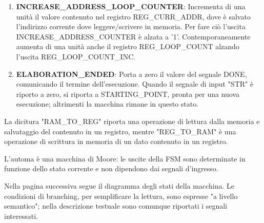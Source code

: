 \documentclass[a4paper]{article}
\begin{document}
\begin{enumerate}
    \item {\bf INCREASE\_ADDRESS\_LOOP\_COUNTER}: Incrementa di una unità il valore contenuto nel registro REG\_CURR\_ADDR, dove è salvato l'indirizzo corrente dove leggere/scrivere in memoria. Per fare ciò l'uscita INCREASE\_ADDRESS\_COUNTER è alzata a '1'. Contemporaneamente aumenta di una unità anche il registro REG\_LOOP\_COUNT alzando l'uscita REG\_LOOP\_COUNT\_INC.
    \item {\bf ELABORATION\_ENDED}: Porta a zero il valore del segnale DONE, comunicando il termine dell'esecuzione. Quando il segnale di input "STR" è riporto a zero, si riporta a STARTING\_POINT, pronta per una nuova esecuzione; altrimenti la macchina rimane in questo stato.
\end{enumerate}

La dicitura "RAM\_TO\_REG" riporta una operazione di lettura dalla memoria e salvataggio del contenuto in un registro, mentre "REG\_TO\_RAM" è una operazione di scrittura in memoria di un dato contenuto in un registro.

L'automa è una macchina di Moore: le uscite della FSM sono determinate in funzione dello stato corrente e non dipendono dai segnali d'ingresso.

Nella pagina successiva segue il diagramma degli stati della macchina. Le condizioni di branching, per semplificare la lettura, sono espresse "a livello semantico"; nella descrizione testuale sono comunque riportati i segnali interessati.
\end{document}
